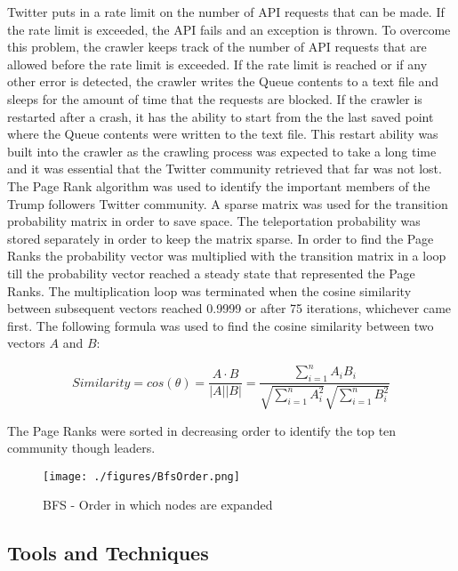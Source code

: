 \documentclass{sig-alternate-05-2015}
\begin{document}
Twitter puts in a rate limit on the number of API requests that can be made. If the rate limit is exceeded, the API fails and an exception is thrown. To overcome this problem, the crawler keeps track of the number of API requests that are allowed before the rate limit is exceeded. If the rate limit is reached or if any other error is detected, the crawler writes the Queue contents to a text file and sleeps for the amount of time that the requests are blocked. If the crawler is restarted after a crash, it has the ability to start from the the last saved point where the Queue contents were written to the text file. This restart ability was built into the crawler as the crawling process was expected to take a long time and it was essential that the Twitter community retrieved that far was not lost.\\

The Page Rank algorithm\cite{IRB} was used to identify the important members of the Trump followers Twitter community. A sparse matrix was used for the transition probability matrix in order to save space. The teleportation probability was stored separately in order to keep the matrix sparse. In order to find the Page Ranks the probability vector was multiplied with the transition matrix in a loop till the probability vector reached a steady state that represented the Page Ranks. The multiplication loop was terminated when the cosine similarity between subsequent vectors reached 0.9999 or after 75 iterations, whichever came first. The following formula was used to find the cosine similarity between two vectors $A$ and $B$\cite{CosineSimilarity}:

\begin{displaymath}
Similarity = cos(\theta) = \frac{A \cdot B}{\left | A \right | \left | B \right |} = \frac{\sum\limits_{i=1}^{n} A_i B_i}{\sqrt{\sum\limits_{i=1}^{n} A_i^2 } \sqrt{\sum\limits_{i=1}^{n} B_i^2 }}
\end{displaymath}

The Page Ranks were sorted in decreasing order to identify the top ten community though leaders.

\begin{figure}[!t]
\centering
\texttt{[image: ./figures/BfsOrder.png]}
\caption{BFS\cite{BFS} - Order in which nodes are expanded}
\label{BfsOrder}
\end{figure}

\subsection{Tools and Techniques}
\end{document}
